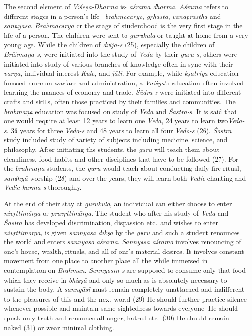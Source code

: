 The second element of \emph{Viśeṣa-Dharma} is- \emph{āśrama} \emph{dharma}. \emph{Āśrama} refers to different stages in a person's life --\emph{brahmacarya}, \emph{gṛhasta}, \emph{vānaprastha} and \emph{sannyāsa}. \emph{Brahmacarya} or the stage of studenthood is the very first stage in the life of a person. The children were sent to \emph{gurukula} or taught at home from a very young age. While the children of \emph{dvija-s} (25), especially the children of \emph{Brāhmaṇa-s}, were initiated into the study of \emph{Veda} by their \emph{guru-s}, others were initiated into study of various branches of knowledge often in sync with their \emph{varṇa}, individual interest \emph{Kula}, and \emph{jāti}. For example, while \emph{kṣatriya} education focused more on warfare and administration, a \emph{Vaiśya}'s education often involved learning the nuances of economy and trade. \emph{Śūdra-s} were initiated into different crafts and skills, often those practiced by their families and communities. The \emph{brāhmaṇa} education was focused on study of \emph{Veda} and \emph{Śāstra-s}. It is said that one would require at least 12 years to learn one \emph{Veda}, 24 years to learn two\emph{Veda-s}, 36 years for three \emph{Veda-s} and 48 years to learn all four \emph{Veda-s} (26). \emph{Śāstra} study included study of variety of subjects including medicine, science, and philosophy. After initiating the students, the \emph{guru} will teach them about cleanliness, food habits and other disciplines that have to be followed (27). For the \emph{brāhmaṇa} students, the \emph{guru} would teach about conducting daily fire ritual, \emph{sandhyā}-worship (28) and over the years, they will learn both \emph{Vedic} chanting and \emph{Vedic} \emph{karma-s} thoroughly.

At the end of their stay at \emph{gurukula}, an individual can either choose to enter \emph{nivṛttimārga} or \emph{pravṛttimārga}. The student who after his study of \emph{Veda} and \emph{Śāstra} has developed discrimination, dispassion etc.\ and wishes to enter \emph{nivṛttimārga}, is given \emph{sannyāsa} \emph{dīkṣā} by the \emph{guru} and such a student renounces the world and enters \emph{sannyāsa} \emph{āśrama}. \emph{Sannyāsa} \emph{āśrama} involves renouncing of one's house, wealth, rituals, and all of one's material desires. It involves constant movement from one place to another place all the while immersed in contemplation on \emph{Brahman}. \emph{Sannyāsin-s} are supposed to consume only that food which they receive in \emph{bhikṣā} and only so much as is absolutely necessary to sustain the body. A \emph{sannyāsī} must remain completely unattached and indifferent to the pleasures of this and the next world (29) He should further practice silence whenever possible and maintain same sightedness towards everyone. He should speak only truth and renounce all anger, hatred etc.\ (30) He should remain naked (31) or wear minimal clothing.

